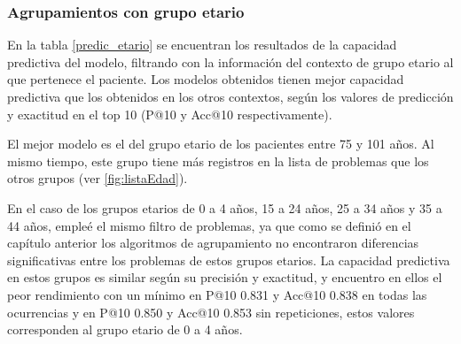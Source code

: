 \subsubsection{Agrupamientos con grupo etario}

En la tabla \ref{predic_etario} se encuentran los resultados de la capacidad predictiva del modelo, filtrando con la información del contexto de grupo etario al que pertenece el paciente. Los modelos obtenidos tienen mejor capacidad predictiva que los obtenidos en los otros contextos, según los valores de predicción y exactitud en el top 10 (P@10 y Acc@10 respectivamente).

El mejor modelo es el del grupo etario de los pacientes entre 75 y 101 años. Al mismo tiempo, este grupo tiene más registros en la lista de problemas que los otros grupos (ver \ref{fig:listaEdad}).

En el caso de los grupos etarios de 0 a 4 años, 15 a 24 años, 25 a 34 años y 35 a 44 años, empleé el mismo filtro de problemas, ya que como se definió en el capítulo anterior los algoritmos de agrupamiento no encontraron diferencias significativas entre los problemas de estos grupos etarios. La capacidad predictiva en estos grupos es similar según su precisión y exactitud, y encuentro en ellos el peor rendimiento con un mínimo en P@10 \num{0.831} y Acc@10 \num{0.838} en todas las ocurrencias y en P@10 \num{0.850} y Acc@10 \num{0.853} sin repeticiones, estos valores corresponden al grupo etario de 0 a 4 años.


